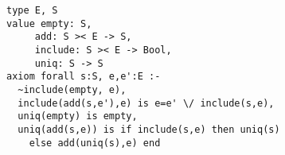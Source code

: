 \MediumPicture{}


\z \begin{lstlisting}
type E, S
value empty: S,
     add: S >< E -> S,
     include: S >< E -> Bool,
     uniq: S -> S
axiom forall s:S, e,e':E :-
  ~include(empty, e),
  include(add(s,e'),e) is e=e' \/ include(s,e),
  uniq(empty) is empty,
  uniq(add(s,e)) is if include(s,e) then uniq(s)
    else add(uniq(s),e) end
\end{lstlisting}

\MediumPicture{}
